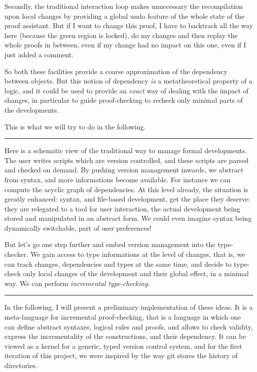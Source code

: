 \documentclass[12pt]{article}
\newcommand{\slide}{\vspace{1em} \hrule \vspace{1em}}
\begin{document}
Secondly, the traditional interaction loop makes unnecessary the
recompilation upon local changes by providing a global undo feature of
the whole state of the proof assistant. But if I want to change this
proof, I have to backtrack all the way here (because the green region
is locked), do my changes and then replay the whole proofs in between,
even if my change had no impact on this one, even if I just added a
comment.

So both these facilities provide a coarse approximation of the
dependency between objects. But this notion of dependency \emph{is} a
metatheoretical property of a logic, and it could be used to provide
an \emph{exact} way of dealing with the impact of changes, in
particular to guide proof-checking to recheck only minimal parts of
the developments.

This is what we will try to do in the following.

\slide

Here is a schematic view of the traditional way to manage formal
developments. The user writes scripts which are version controlled,
and these scripts are parsed and checked on demand. By pushing version
management inwards, we abstract from syntax, and more informations
become available. For instance we can compute the acyclic graph of
dependencies. At this level already, the situation is greatly
enhanced: syntax, and file-based development, get the place they
deserve: they are relegated to a tool for user interaction, the actual
development being stored and manipulated in an abstract form. We could
even imagine syntax being dynamically switchable, part of user
preferences!

But let's go one step further and embed version management into the
type-checker. We gain access to type informations at the level of
changes, that is, we can track changes, dependencies and types at the
same time, and decide to type-check only local changes of the
development and their global effect, in a minimal way. We can perform
\emph{incremental type-checking}.

\slide

In the following, I will present a preliminary implementation of these
ideas. It is a meta-language for incremental proof-checking, that is a
language in which one can define abstract syntaxes, logical rules and
proofs, and allows to check validity, express the incrementality of
the constructions, and their dependency. It can be viewed as a kernel
for a generic, typed version control system, and for the first
iteration of this project, we were inspired by the way \textsf{git}
stores the history of directories.
\end{document}
